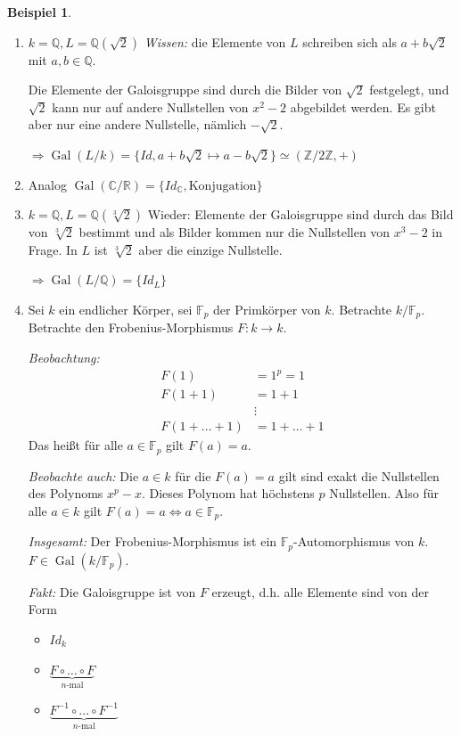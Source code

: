 \documentclass[12pt,parskip=full]{scrartcl}
\newcommand{\setZ}{\mathbb{Z}}
\newcommand{\setQ}{\mathbb{Q}}
\newcommand{\setR}{\mathbb{R}}
\newcommand{\setC}{\mathbb{C}}
\DeclareMathOperator{\Gal}{Gal}
\theoremstyle{definition}
\newtheorem{example}[theorem]{Beispiel}
\theoremstyle{remark}
\begin{document}
	\begin{example}
		\begin{enumerate}
			\item $k = \setQ, L = \setQ(\sqrt{2})$ \textit{Wissen:} die Elemente von $L$ schreiben sich als $a + b \sqrt{2}$ mit $a,b \in \setQ$.
			
			Die Elemente der Galoisgruppe sind durch die Bilder von $\sqrt{2}$ festgelegt, und $\sqrt{2}$ kann nur auf andere Nullstellen von $x^2 - 2$ abgebildet werden. Es gibt aber nur eine andere Nullstelle, nämlich $- \sqrt{2}$.
			
			$\Rightarrow \Gal(L/k) = \{ Id, a + b\sqrt{2} \mapsto a - b\sqrt{2} \} \simeq (\setZ/2\setZ, +)$
			\item Analog $\Gal(\setC/\setR) = \{ Id_\setC, \text{Konjugation} \}$
			
			\item $k = \setQ, L = \setQ(\sqrt[3]{2})$ Wieder: Elemente der Galoisgruppe sind durch das Bild von $\sqrt[3]{2}$ bestimmt und als Bilder kommen nur die Nullstellen von $x^3 - 2$ in Frage. In $L$ ist $\sqrt[3]{2}$ aber die einzige Nullstelle.
			
			$\Rightarrow \Gal(L/\setQ) = \{ Id_L \}$
			
			\item Sei $k$ ein endlicher Körper, sei $\mathbb{F}_p$ der Primkörper von $k$. Betrachte $k/\mathbb{F}_p$. Betrachte den Frobenius-Morphismus $F: k \to k$. 
			
			\textit{Beobachtung:}
			\begin{align*}
				F(1) &= 1^p = 1 \\
				F(1 + 1) &= 1 + 1 \\
				&\vdots \\
				F(1 + \dots + 1) &= 1 + \dots + 1
			\end{align*}
			Das heißt für alle $a \in \mathbb{F}_p$ gilt $F(a) = a$.
			
			\textit{Beobachte auch:} Die $a \in k$ für die $F(a) = a$ gilt sind exakt die Nullstellen des Polynoms $x^p - x$. Dieses Polynom hat höchstens $p$ Nullstellen. Also für alle $a \in k$ gilt $F(a) = a \Leftrightarrow a \in \mathbb{F}_p$.
			
			\textit{Insgesamt:} Der Frobenius-Morphismus ist ein $\mathbb{F}_p$-Automorphismus von $k$. $F \in \Gal(k/\mathbb{F}_p)$.
			
			\textit{Fakt:} Die Galoisgruppe ist von $F$ erzeugt, d.h. alle Elemente sind von der Form
			\begin{itemize}
				\item $Id_k$
				\item $\underbrace{F \circ \dots \circ F}_\text{$n$-mal}$
				\item $\underbrace{F^{-1} \circ \dots \circ F^{-1}}_\text{$n$-mal}$
			\end{itemize}
			
		\end{enumerate}
	\end{example}
\end{document}
